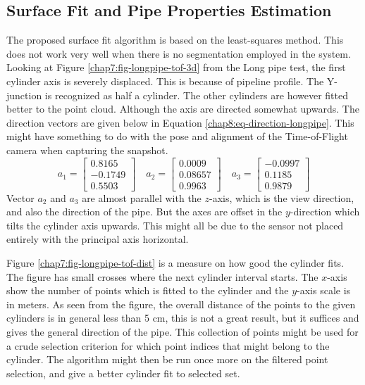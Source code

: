 \subsection{Surface Fit and Pipe Properties Estimation}
The proposed surface fit algorithm is based on the least-squares method. This does not
work very well 
when there is no segmentation employed in the system. Looking at Figure
\ref{chap7:fig-longpipe-tof-3d} from the Long pipe test, the first cylinder axis is severely displaced. This
is because of pipeline profile. The Y-junction is recognized as half a cylinder. The
other cylinders are however fitted better to the point cloud. Although the axis are 
directed somewhat upwards. The direction vectors are given below in Equation
\eqref{chap8:eq-direction-longpipe}. This might have something to do with the pose and
alignment of the Time-of-Flight camera when capturing the snapshot.
\begin{equation}
    \label{chap8:eq-direction-longpipe}
    a_1 = \left[ \begin{matrix}
                        0.8165\\
                       -0.1749\\
                       0.5503 
                 \end{matrix} \right] \quad a_2 = \left [
                 \begin{matrix}
                       0.0009\\
                       0.08657\\
                       0.9963
                 \end{matrix} \right] \quad a_3 = \left [
                 \begin{matrix}
                       -0.0997\\
                       0.1185\\
                       0.9879
                 \end{matrix} \right]
\end{equation}
Vector $a_2$ and $a_3$ are almost parallel with the $z$-axis, which is the view direction,
and also the direction of the pipe. But the axes are offset in the $y$-direction which tilts
the cylinder axis upwards. This might all be due to the sensor not placed entirely with
the principal axis horizontal. 

Figure \ref{chap7:fig-longpipe-tof-dist} is a measure on how good the cylinder fits. The
figure has small crosses where the next cylinder interval starts. The $x$-axis show
the number of points which is fitted to the cylinder and the $y$-axis scale is in meters.
As seen from the figure, the overall distance of the points to the given cylinders is in
general less than 5 cm, this is not a great result, but it suffices and gives the general
direction of the pipe. This collection of points might be used for a crude selection
criterion for which point indices that might belong to the cylinder. The algorithm might
then be run once more on the filtered point selection, and give a better cylinder fit to
selected set. 

